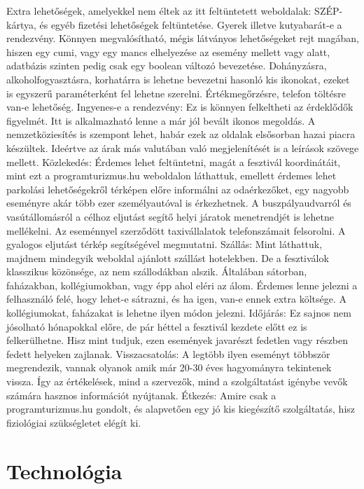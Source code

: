 \documentclass[11pt]{article}
\begin{document}
Extra lehetőségek, amelyekkel nem éltek az itt feltüntetett weboldalak: 
SZÉP-kártya, és egyéb fizetési lehetőségek feltüntetése.
Gyerek illetve kutyabarát-e a rendezvény. Könnyen megvalósítható, mégis látványos lehetőségeket rejt magában, hiszen egy cumi, vagy egy mancs elhelyezése az esemény mellett vagy alatt, adatbázis szinten pedig csak egy boolean változó bevezetése.
Dohányzásra, alkoholfogyasztásra, korhatárra is lehetne bevezetni hasonló kis ikonokat, ezeket is egyszerű paraméterként fel lehetne szerelni.
Értékmegőrzésre, telefon töltésre van-e lehetőség. 
Ingyenes-e a rendezvény: Ez is könnyen felkeltheti az érdeklődők figyelmét. Itt is alkalmazható lenne a már jól bevált ikonos megoldás.
A nemzetköziesítés is szempont lehet, habár ezek az oldalak elsősorban hazai piacra készültek. Ideértve az árak más valutában való megjelenítését is a leírások szövege mellett.
Közlekedés: Érdemes lehet feltüntetni, magát a fesztivál koordinátáit, mint ezt a programturizmus.hu weboldalon láthattuk, emellett érdemes lehet parkolási lehetőségekről térképen előre informálni az odaérkezőket, egy nagyobb eseményre akár több ezer személyautóval is érkezhetnek. A buszpályaudvarról és vasútállomásról a célhoz eljutást segítő helyi járatok menetrendjét is lehetne mellékelni. Az eseménnyel szerződött taxivállalatok telefonszámait felsorolni. A gyalogos eljutást térkép segítségével megmutatni.
Szállás: Mint láthattuk, majdnem mindegyik weboldal ajánlott szállást hotelekben. De a fesztiválok klasszikus közönsége, az nem szállodákban alszik. Általában sátorban, faházakban, kollégiumokban, vagy épp ahol eléri az álom. Érdemes lenne jelezni a felhasználó felé, hogy lehet-e sátrazni, és ha igen, van-e ennek extra költsége. A kollégiumokat, faházakat is lehetne ilyen módon jelezni.
Időjárás: Ez sajnos nem jósolható hónapokkal előre, de pár héttel a fesztivál kezdete előtt ez is felkerülhetne. Hisz mint tudjuk, ezen események javarészt fedetlen vagy részben fedett helyeken zajlanak.
Visszacsatolás: A legtöbb ilyen eseményt többször megrendezik, vannak olyanok amik már 20-30 éves hagyományra tekintenek vissza. Így az értékelések, mind a szervezők, mind a szolgáltatást igénybe vevők számára hasznos információt nyújtanak.
Étkezés: Amire csak a programturizmus.hu gondolt, és alapvetően egy jó kis kiegészítő szolgáltatás, hisz fiziológiai szükségletet elégít ki.

\section{Technológia}
\end{document}
